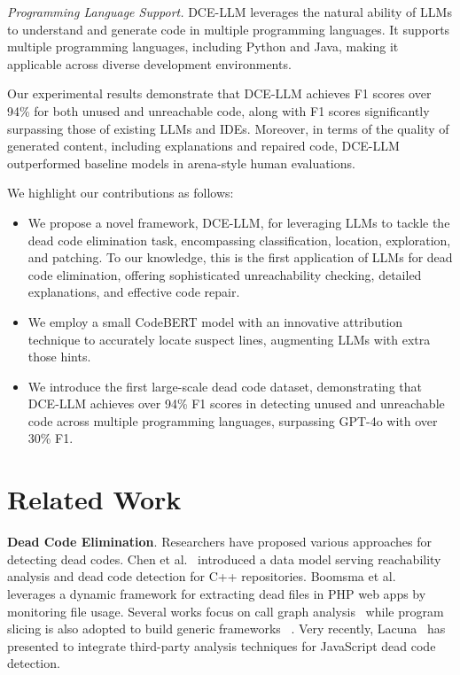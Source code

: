 \documentclass[11pt]{article}
\begin{document}
\textit{Programming Language Support.} DCE-LLM leverages the natural ability of LLMs to understand and generate code in multiple programming languages. It supports multiple programming languages, including Python and Java, making it applicable across diverse development environments.

Our experimental results demonstrate that DCE-LLM achieves F1 scores over 94\% for both unused and unreachable code, along with F1 scores significantly surpassing those of existing LLMs and IDEs. Moreover, in terms of the quality of generated content, including explanations and repaired code, DCE-LLM outperformed baseline models in arena-style human evaluations.

We highlight our contributions as follows:
\begin{itemize}
\item We propose a novel framework, DCE-LLM, for leveraging LLMs to tackle the dead code elimination task, encompassing classification, location, exploration, and patching. To our knowledge, this is the first application of LLMs for dead code elimination, offering sophisticated unreachability checking, detailed explanations, and effective code repair.
\item We employ a small CodeBERT model with an innovative attribution technique to accurately locate suspect lines, augmenting LLMs with extra those hints.
\item We introduce the first large-scale dead code dataset, demonstrating that DCE-LLM achieves over 94\% F1 scores in detecting unused and unreachable code across multiple programming languages, surpassing GPT-4o with over 30\% F1.
\end{itemize}


\section{Related Work}
\textbf{Dead Code Elimination}. Researchers have proposed various approaches for detecting dead codes. Chen et al.~\cite{chen1998c++} introduced a data model serving reachability
analysis and dead code detection for C++ repositories. Boomsma et al.~\cite{boomsma2012dead} leverages a dynamic framework for extracting dead files in PHP web apps by monitoring file usage. Several works focus on call graph analysis~\cite{romano2016graph, romano2018exploring} while program slicing is also adopted to build generic frameworks~\cite{alabwaini2018using, wang2017dead}
. Very recently, Lacuna~\cite{malavolta2023javascript} has presented to integrate third-party analysis techniques for JavaScript dead code detection.
\end{document}
